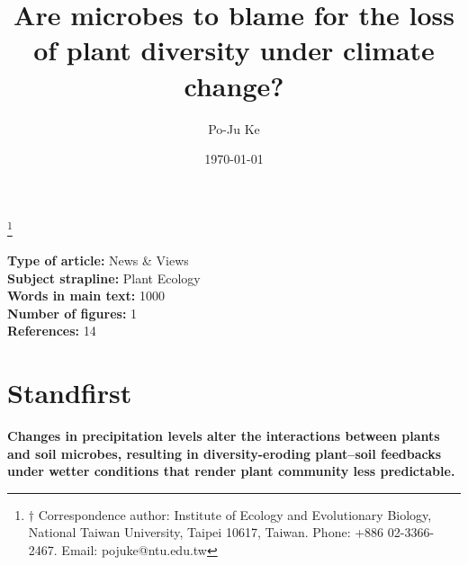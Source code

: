 \documentclass[hidelinks,letterpaper, 11pt]{article}
\newcommand\blfootnote[1]{%
	\begingroup
	\renewcommand\thefootnote{}\footnote{#1}%
	\addtocounter{footnote}{-1}%
	\endgroup
}
\begin{document}
	
	
	
\doublespacing
\title{Are microbes to blame for the loss of plant diversity under climate change?}
\author[1, $\dagger$]{Po-Ju Ke}
\date{\today}
\maketitle
\blfootnote{$\dagger$ Correspondence author: Institute of Ecology and Evolutionary Biology, National Taiwan University, Taipei 10617, Taiwan. Phone: +886 02-3366-2467. Email: pojuke@ntu.edu.tw}
	
\onehalfspacing
\noindent \textbf{Type of article:} News \& Views\\
\noindent \textbf{Subject strapline:} Plant Ecology\\
\noindent \textbf{Words in main text:} 1000\\
\noindent \textbf{Number of figures:} 1\\
\noindent \textbf{References:} 14\\
	

\linenumbers
\doublespacing

\newpage
\section*{Standfirst}
\textbf{Changes in precipitation levels alter the interactions between plants and soil microbes, resulting in diversity-eroding plant--soil feedbacks under wetter conditions that render plant community less predictable.}
\bigskip
\end{document}
